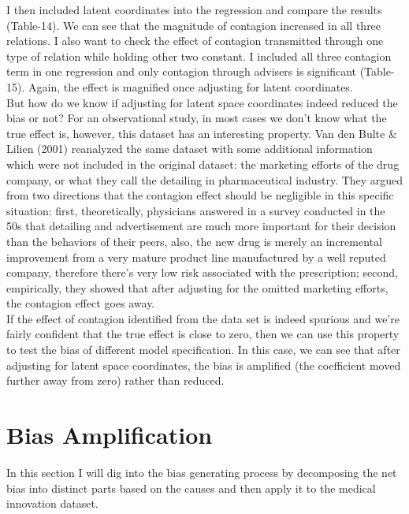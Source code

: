 \documentclass[11pt]{article}
\begin{document}
I then included latent coordinates into the regression and compare the results (Table-14). We can see that the magnitude of contagion increased in all three relations. I also want to check the effect of contagion transmitted through one type of relation while holding other two constant. I included all three contagion term in one regression and only contagion through advisers is significant (Table-15). Again, the effect is magnified once adjusting for latent coordinates.\\

But how do we know if adjusting for latent space coordinates indeed reduced the bias or not? For an observational study, in most cases we don't know what the true effect is, however, this dataset has an interesting property. Van den Bulte \& Lilien (2001) reanalyzed the same dataset with some additional information which were not included in the original dataset: the marketing efforts of the drug company, or what they call the detailing in pharmaceutical industry. They argued from two directions that the contagion effect should be negligible in this specific situation: first, theoretically, physicians answered in a survey conducted in the 50s that detailing and advertisement are much more important for their decision than the behaviors of their peers, also, the new drug is merely an incremental improvement from a very mature product line manufactured by a well reputed company, therefore there's very low risk associated with the prescription; second, empirically, they showed that after adjusting for the omitted marketing efforts, the contagion effect goes away. \\

If the effect of contagion identified from the data set is indeed spurious and we're fairly confident that the true effect is close to zero, then we can use this property to test the bias of different model specification. In this case, we can see that after adjusting for latent space coordinates, the bias is amplified (the coefficient moved further away from zero) rather than reduced.\\

\section{Bias Amplification}
In this section I will dig into the bias generating process by decomposing the net bias into distinct parts based on the causes and then apply it to the medical innovation dataset.\\
\end{document}
